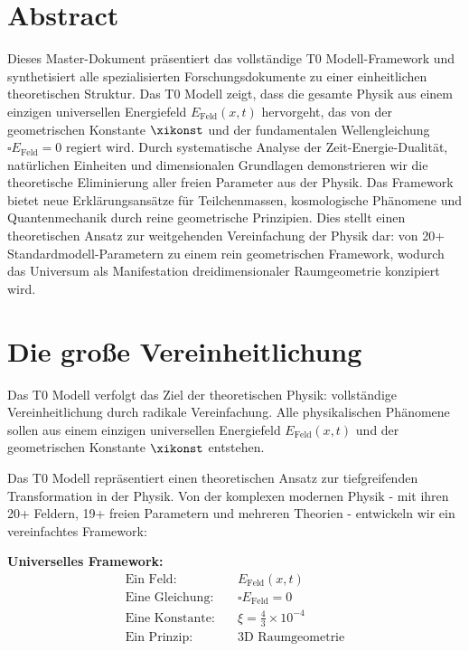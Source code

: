 
\section*{Abstract}
		Dieses Master-Dokument präsentiert das vollständige T0 Modell-Framework und synthetisiert alle spezialisierten Forschungsdokumente zu einer einheitlichen theoretischen Struktur. Das T0 Modell zeigt, dass die gesamte Physik aus einem einzigen universellen Energiefeld $E_{\text{Feld}}(x,t)$ hervorgeht, das von der geometrischen Konstante $\xikonst$ und der fundamentalen Wellengleichung $\square E_{\text{Feld}} = 0$ regiert wird. Durch systematische Analyse der Zeit-Energie-Dualität, natürlichen Einheiten und dimensionalen Grundlagen demonstrieren wir die theoretische Eliminierung aller freien Parameter aus der Physik. Das Framework bietet neue Erklärungsansätze für Teilchenmassen, kosmologische Phänomene und Quantenmechanik durch reine geometrische Prinzipien. Dies stellt einen theoretischen Ansatz zur weitgehenden Vereinfachung der Physik dar: von 20+ Standardmodell-Parametern zu einem rein geometrischen Framework, wodurch das Universum als Manifestation dreidimensionaler Raumgeometrie konzipiert wird.


	
	\section{Die große Vereinheitlichung}
	
	\begin{revolutionaer}
		Das T0 Modell verfolgt das Ziel der theoretischen Physik: vollständige Vereinheitlichung durch radikale Vereinfachung. Alle physikalischen Phänomene sollen aus einem einzigen universellen Energiefeld $E_{\text{Feld}}(x,t)$ und der geometrischen Konstante $\xikonst$ entstehen.
	\end{revolutionaer}
	
	Das T0 Modell repräsentiert einen theoretischen Ansatz zur tiefgreifenden Transformation in der Physik. Von der komplexen modernen Physik - mit ihren 20+ Feldern, 19+ freien Parametern und mehreren Theorien - entwickeln wir ein vereinfachtes Framework:
	
	\begin{formel}
		\textbf{Universelles Framework:}
		\begin{align}
			\text{Ein Feld:} \quad &E_{\text{Feld}}(x,t) \\
			\text{Eine Gleichung:} \quad &\square E_{\text{Feld}} = 0 \\
			\text{Eine Konstante:} \quad &\xi = \frac{4}{3} \times 10^{-4} \\
			\text{Ein Prinzip:} \quad &\text{3D Raumgeometrie}
		\end{align}
	\end{formel}
	
